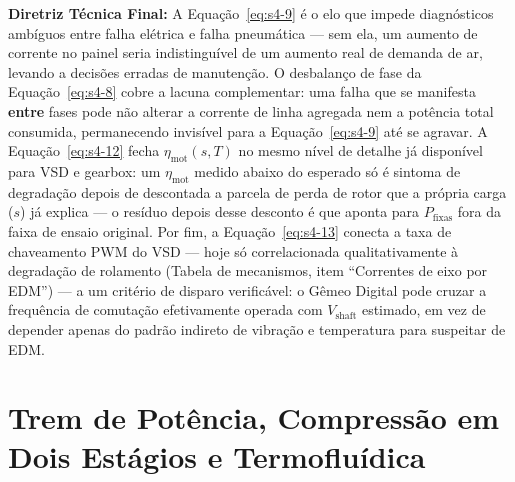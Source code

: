 \documentclass[12pt,a4paper]{article}
\numberwithin{equation}{section}
\numberwithin{table}{section}
\numberwithin{figure}{section}
\begin{document}
	\textbf{Diretriz Técnica Final:} A Equação~\eqref{eq:s4-9} é o elo que impede diagnósticos ambíguos entre falha elétrica e falha pneumática — sem ela, um aumento de corrente no painel seria indistinguível de um aumento real de demanda de ar, levando a decisões erradas de manutenção. O desbalanço de fase da Equação~\eqref{eq:s4-8} cobre a lacuna complementar: uma falha que se manifesta \textbf{entre} fases pode não alterar a corrente de linha agregada nem a potência total consumida, permanecendo invisível para a Equação~\eqref{eq:s4-9} até se agravar. A Equação~\eqref{eq:s4-12} fecha $\eta_{\text{mot}}(s,T)$ no mesmo nível de detalhe já disponível para VSD e gearbox: um $\eta_{\text{mot}}$ medido abaixo do esperado só é sintoma de degradação depois de descontada a parcela de perda de rotor que a própria carga ($s$) já explica — o resíduo depois desse desconto é que aponta para $P_{\text{fixas}}$ fora da faixa de ensaio original. Por fim, a Equação~\eqref{eq:s4-13} conecta a taxa de chaveamento PWM do VSD — hoje só correlacionada qualitativamente à degradação de rolamento (Tabela de mecanismos, item ``Correntes de eixo por EDM'') — a um critério de disparo verificável: o Gêmeo Digital pode cruzar a frequência de comutação efetivamente operada com $V_{\text{shaft}}$ estimado, em vez de depender apenas do padrão indireto de vibração e temperatura para suspeitar de EDM.

	
	
	\clearpage
	\section{\textbf{Trem de Potência, Compressão em Dois Estágios e Termofluídica}}

\end{document}
